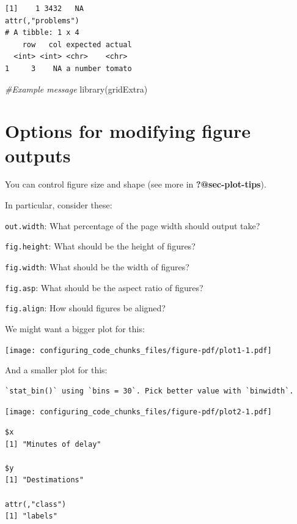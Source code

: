 \documentclass[
  letterpaper,
  DIV=11,
  numbers=noendperiod]{scrreprt}
\newenvironment{Shaded}{}{}
\newcommand{\CommentTok}[1]{\textcolor[rgb]{0.38,0.63,0.69}{\textit{#1}}}
\newcommand{\FunctionTok}[1]{\textcolor[rgb]{0.02,0.16,0.49}{#1}}
\newcommand{\NormalTok}[1]{#1}
\begin{document}
\begin{verbatim}
[1]    1 3432   NA
attr(,"problems")
# A tibble: 1 x 4
    row   col expected actual
  <int> <int> <chr>    <chr> 
1     3    NA a number tomato
\end{verbatim}

\begin{Shaded}
\begin{Highlighting}[]
\CommentTok{\#Example message}
\FunctionTok{library}\NormalTok{(gridExtra)}
\end{Highlighting}
\end{Shaded}

\section{Options for modifying figure
outputs}\label{options-for-modifying-figure-outputs}

You can control figure size and shape (see more in
\textbf{?@sec-plot-tips}).

In particular, consider these:

\texttt{out.width}: What percentage of the page width should output
take?

\texttt{fig.height}: What should be the height of figures?

\texttt{fig.width}: What should be the width of figures?

\texttt{fig.asp}: What should be the aspect ratio of figures?

\texttt{fig.align}: How should figures be aligned?

We might want a bigger plot for this:

\texttt{[image: configuring\_code\_chunks\_files/figure-pdf/plot1-1.pdf]}

And a smaller plot for this:

\begin{verbatim}
`stat_bin()` using `bins = 30`. Pick better value with `binwidth`.
\end{verbatim}

\begin{center}
\texttt{[image: configuring\_code\_chunks\_files/figure-pdf/plot2-1.pdf]}
\end{center}

\begin{verbatim}
$x
[1] "Minutes of delay"

$y
[1] "Destimations"

attr(,"class")
[1] "labels"
\end{verbatim}
\end{document}
